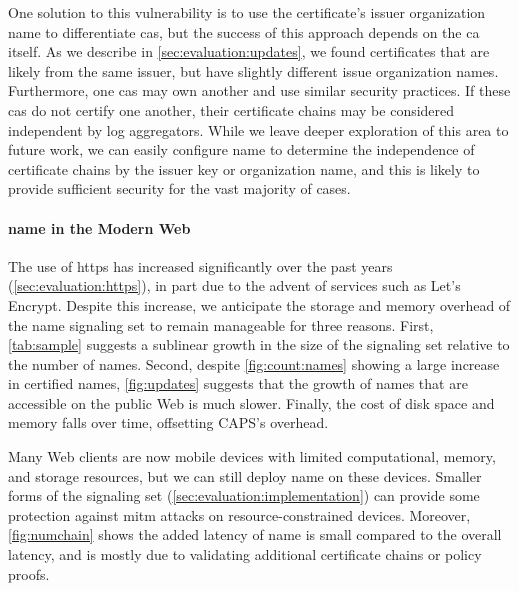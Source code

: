 One solution to this vulnerability is to use the certificate's issuer
organization name to differentiate \acp{ca}, but the success of this approach
depends on the \ac{ca} itself. As we describe in
\autoref{sec:evaluation:updates}, we found certificates that are likely from the
same issuer, but have slightly different issue organization names. Furthermore,
one \acp{ca} may own another and use similar security practices. If these
\acp{ca} do not certify one another, their certificate chains may be considered
independent by log aggregators. While we leave deeper exploration of this area
to future work, we can easily configure \ac{name} to determine the independence
of certificate chains by the issuer key or organization name, and this is likely
to provide sufficient security for the vast majority of cases.

\paragraph{\ac{name} in the Modern Web}
The use of \ac{https} has increased significantly over the past years
(\autoref{sec:evaluation:https}), in part due to the advent of services such as
Let's Encrypt. Despite this increase, we anticipate the 
storage and memory overhead of the \ac{name} signaling set to remain manageable for
three reasons. First, \autoref{tab:sample} suggests a sublinear growth in the
size of the signaling set relative to the number of names. Second, despite
\autoref{fig:count:names} showing a large increase in certified names, 
\autoref{fig:updates} suggests that the growth
of names that are accessible on the public Web is much slower. Finally, the
cost of disk space and memory falls over time, offsetting CAPS's overhead.

Many Web clients are now mobile devices with limited
computational, memory, and storage resources, but we can still deploy
\ac{name} on these devices. 
Smaller forms of the signaling set (\autoref{sec:evaluation:implementation}) can
provide some protection against \ac{mitm} attacks on resource-constrained
devices. Moreover, \autoref{fig:numchain} shows the added latency of \ac{name}
is small compared to the overall latency, and is mostly due to validating
additional certificate chains or policy proofs.
